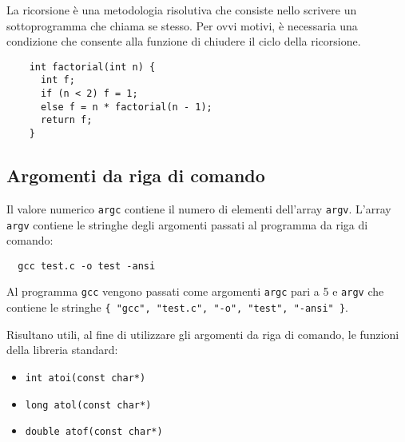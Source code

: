 La ricorsione è una metodologia risolutiva che consiste nello scrivere un sottoprogramma che chiama se stesso.
Per ovvi motivi, è necessaria una condizione che consente alla funzione di chiudere il ciclo della ricorsione.

\begin{example}
  \begin{verbatim}
    int factorial(int n) {
      int f;
      if (n < 2) f = 1;
      else f = n * factorial(n - 1);
      return f;
    }
  \end{verbatim}
\end{example}

\subsection{Argomenti da riga di comando}

Il valore numerico \verb|argc| contiene il numero di elementi dell'array \verb|argv|. L'array \verb|argv| contiene le stringhe degli argomenti passati al programma da riga di comando:
\begin{verbatim}
  gcc test.c -o test -ansi
\end{verbatim}
Al programma \verb|gcc| vengono passati come argomenti \verb|argc| pari a 5 e \verb|argv| che contiene le stringhe \verb|{ "gcc", "test.c", "-o", "test", "-ansi" }|.

Risultano utili, al fine di utilizzare gli argomenti da riga di comando, le funzioni della libreria standard:
\begin{itemize}
  \item \verb|int atoi(const char*)|
  \item \verb|long atol(const char*)|
  \item \verb|double atof(const char*)|
\end{itemize}